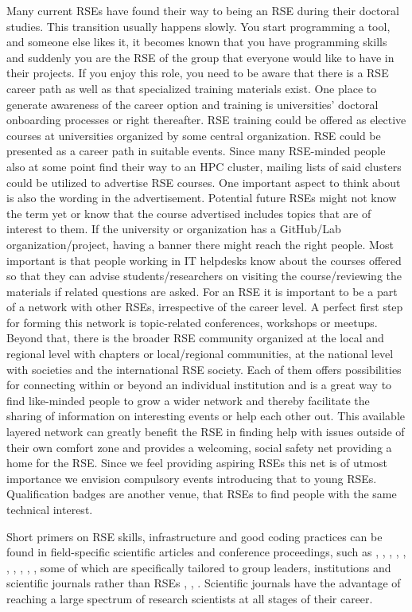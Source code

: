 \documentclass[a4paper
]{article}
\begin{document}
Many current RSEs have found their way to being an RSE during their
doctoral studies. This transition usually happens slowly. You start
programming a tool, and someone else likes it, it becomes known that you
have programming skills and suddenly you are the RSE of the group that
everyone would like to have in their projects. If you enjoy this role,
you need to be aware that there is a RSE career path as well as that
specialized training materials exist. One place to generate awareness of
the career option and training is universities' doctoral onboarding
processes or right thereafter. RSE training could be offered as elective
courses at universities organized by some central organization. RSE
could be presented as a career path in suitable events. Since many
RSE-minded people also at some point find their way to an HPC cluster,
mailing lists of said clusters could be utilized to advertise RSE
courses. One important aspect to think about is also the wording in the
advertisement. Potential future RSEs might not know the term yet or know
that the course advertised includes topics that are of interest to them.
If the university or organization has a GitHub/Lab organization/project,
having a banner there might reach the right people. Most important is
that people working in IT helpdesks know about the courses offered so
that they can advise students/researchers on visiting the
course/reviewing the materials if related questions are asked. For an
RSE it is important to be a part of a network with other RSEs,
irrespective of the career level. A perfect first step for forming this
network is topic-related conferences, workshops or meetups. Beyond that,
there is the broader RSE community organized at the local and regional
level with chapters or local/regional communities, at the national level
with societies and the international RSE society. Each of them offers
possibilities for connecting within or beyond an individual institution
and is a great way to find like-minded people to grow a wider network
and thereby facilitate the sharing of information on interesting events
or help each other out. This available layered network can greatly
benefit the RSE in finding help with issues outside of their own comfort
zone and provides a welcoming, social safety net providing a home for
the RSE. Since we feel providing aspiring RSEs this net is of utmost
importance we envision compulsory events introducing that to young RSEs.
Qualification badges are another venue, that RSEs to find people with
the same technical interest.

Short primers on RSE skills, infrastructure and good coding practices
can be found in field-specific scientific articles and conference
proceedings, such as \autocite{Roberts1969}, \autocite{Baxter2006},
\autocite{Prlic2012}, \autocite{Leprevost2014}, \autocite{Wilson2014},
\autocite{Stodden2014}, \autocite{Crusoe2016}, \autocite{Crick2017},
\autocite{Fehr2021}, \autocite{Grossfield2022}, some of which are
specifically tailored to group leaders, institutions and scientific
journals rather than RSEs \autocite{ChueHong2013},
\autocite{ChueHong2014}, \autocite{Katerbow2018}. Scientific journals
have the advantage of reaching a large spectrum of research scientists
at all stages of their career.
\end{document}
